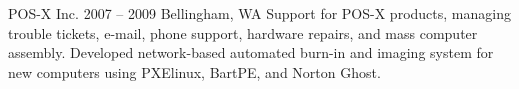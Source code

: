 {POS-X Inc.}
{2007 -- 2009}
{Bellingham, WA}
{Support for POS-X products, managing trouble tickets, e-mail, phone support, hardware repairs, and mass computer assembly. Developed network-based automated burn-in and imaging system for new computers using PXElinux, BartPE, and Norton Ghost.}
